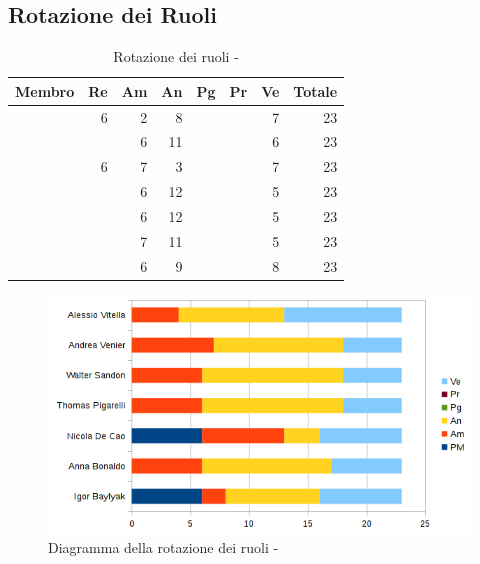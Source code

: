 \documentclass[12pt,a4paper]{article}
\begin{document}
\newpage

\subsection{Rotazione dei Ruoli}

\begin{table}[H]
	\begin{center}
		\begin{tabular}{l r r r r r r r}
			\toprule
			\textbf{Membro}	&	\textbf{Re}	&	\textbf{Am}	& \textbf{An} & \textbf{Pg} & \textbf{Pr} & \textbf{Ve} & \textbf{Totale}\\
			\midrule
			\midrule
			\IB & 6 & 2 & 8 &  &  & 7 & 23 \\
			\midrule
			\AB &  & 6 & 11 &  &  & 6 & 23 \\
			\midrule
			\NDC & 6 & 7 & 3 &  &  & 7 & 23 \\
			\midrule
			\TP &  & 6 & 12 & &  & 5 & 23 \\
			\midrule
			\WS &  & 6 & 12 & &  & 5 & 23 \\
			\midrule
			\AVE &  & 7 & 11 &  &  & 5 & 23 \\
			\midrule
			\AVI &  & 6 & 9 &  &  & 8 & 23 \\
			\bottomrule
		\end{tabular}
		\caption{Rotazione dei ruoli - \FA}
	\end{center}
\end{table}

\begin{center}
	\begin{figure}[H]
		\centering
		\includegraphics[width=\textwidth]{diagrammaBarreAnalisiRotazioneRuoli.png}
		\caption{Diagramma della rotazione dei ruoli - \FA}
	\end{figure}
\end{center}
\end{document}
